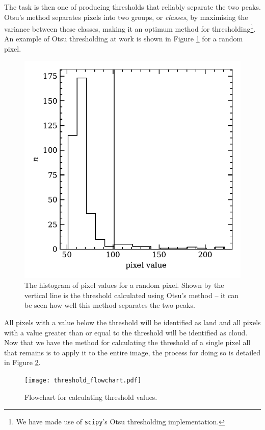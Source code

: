 The task is then one of producing thresholds that reliably separate the two
peaks. Otsu's method \citep{gonzalez2008} separates pixels into two groups, or
\emph{classes}, by maximising the variance between these classes, making it an
optimum method for thresholding\footnote{We have made use of \texttt{scipy}'s
  Otsu thresholding implementation.}. An example of Otsu thresholding at work is
shown in Figure \ref{fig:otsu} for a random pixel.
\begin{figure}
  \centering
    \includegraphics[width=0.8\linewidth]{figures/otsu_bimodal.pdf}
    \caption{The histogram of pixel values for a random pixel. Shown by the
      vertical line is the threshold calculated using Otsu's method -- it can be
      seen how well this method separates the two peaks.}
    \label{fig:otsu}
\end{figure}
All pixels with a value below the threshold will be identified as land and all
pixels with a value greater than or equal to the threshold will be identified
as cloud. Now that we have the method for calculating the threshold of a single
pixel all that remains is to apply it to the entire image, the process for doing
so is detailed in Figure \ref{fig:thr_fc}.
\begin{figure}[t!]
  \centering
  \texttt{[image: threshold\_flowchart.pdf]}
  \caption{Flowchart for calculating threshold values.}
  \label{fig:thr_fc}
\end{figure}

